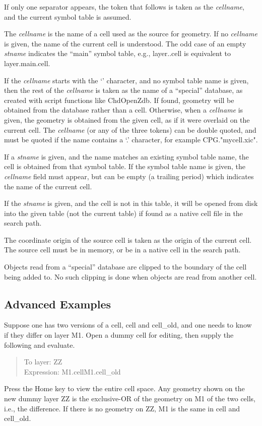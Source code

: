 If only one separator appears, the token that follows is taken as the
{\it cellname}, and the current symbol table is assumed.

The {\it cellname} is the name of a cell used as the source for
geometry.  If no {\it cellname} is given, the name of the current cell
is understood.  The odd case of an empty {\it stname} indicates the
``{\vt main}'' symbol table, e.g., {\vt layer..cell} is equivalent to
{\vt layer.main.cell}.

If the {\it cellname} starts with the `{\vt \@}' character, and no
symbol table name is given, then the rest of the {\it cellname} is
taken as the name of a ``special'' database, as created with script
functions like {\vt ChdOpenZdb}.  If found, geometry will be obtained
from the database rather than a cell.  Otherwise, when a {\it
cellname} is given, the geometry is obtained from the given cell, as
if it were overlaid on the current cell.  The {\it cellname} (or any
of the three tokens) can be double quoted, and must be quoted if the
name contains a `{\vt .}' character, for example {\vt
CPG."mycell.xic"}.

If a {\it stname} is given, and the name matches an existing symbol
table name, the cell is obtained from that symbol table.  If the
symbol table name is given, the {\it cellname} field must appear, but
can be empty (a trailing period) which indicates the name of the
current cell.

If the {\it stname} is given, and the cell is not in this table, it
will be opened from disk into the given table (not the current table)
if found as a native cell file in the search path.

The coordinate origin of the source cell is taken as the origin of the
current cell.  The source cell must be in memory, or be in a native
cell in the search path.

Objects read from a ``special'' database are clipped to the boundary
of the cell being added to.  No such clipping is done when objects are
read from another cell.

\subsection{Advanced Examples}

Suppose one has two versions of a cell, {\vt cell} and {\vt cell\_old},
and one needs to know if they differ on layer {\vt M1}.  Open a dummy
cell for editing, then supply the following and evaluate.
\begin{quote}
{\cb To layer}: {\vt ZZ}\\
{\cb Expression}: {\vt M1.cellM1.cell\_old}
\end{quote}
Press the {\kb Home} key to view the entire cell space.  Any geometry
shown on the new dummy layer {\vt ZZ} is the exclusive-OR of the
geometry on {\vt M1} of the two cells, i.e., the difference.  If there
is no geometry on {\vt ZZ}, {\vt M1} is the same in {\vt cell} and
{\vt cell\_old}.

